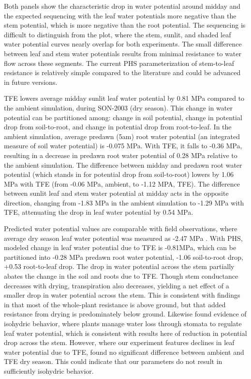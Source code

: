\documentclass[draft,linenumbers]{agujournal}
\begin{document}
    Both panels show the characteristic drop in water potential around midday and the expected sequencing with 
    the leaf water potentials more negative than the stem potential, which is more negative than the root potential.
    The sequencing is difficult to distinguish from the plot, where the stem, sunlit, and shaded leaf water potential curves nearly overlap for both experiments. 
    The small difference between leaf and stem water potentials results from minimal resistance to water flow across these segments. 
    The current PHS parameterization of stem-to-leaf resistance is relatively simple compared to the literature \citep{franks2007} and could be advanced in future versions. 
    
    TFE lowers average midday sunlit leaf water potential by 0.81 MPa compared to the ambient simulation, during SON-2003 (dry season).
    This change in water potential can be partitioned among: change in soil potential, change in potential drop from soil-to-root, and change in potential drop from root-to-leaf. 
    In the ambient simulation, average predawn (5am) root water potential (an integrated measure of soil water potential) is -0.075 MPa. 
    With TFE, it falls to -0.36 MPa, resulting in a decrease in predawn root water potential of 0.28 MPa relative to the ambient simulation. 
    The difference between midday and predawn root water potential (which stands in for potential drop from soil-to-root) 
    lowers by 1.06 MPa with TFE (from -0.06 MPa, ambient, to -1.12 MPA, TFE).
    The difference between sunlit leaf and stem water potential at midday acts in the opposite direction, changing from
    -1.83 MPa in the ambient simulation to -1.29 MPa with TFE, attenuating the drop in leaf water potential by 0.54 MPa.
    
    Predicted water potential values are comparable with field observations, where average dry season leaf water potential was measured as -2.47 MPa \citep{fisher2006}.
    With PHS, modeled change in leaf water potential due to TFE is -0.81MPa, which can be partitioned into -0.28 MPa predawn root water potential, -1.06 soil-to-root drop, +0.53 root-to-leaf drop.
    The drop in water potential across the stem partially abates the change in the soil and roots due to TFE. 
    Though stem conductance decreases with drying, transpiration also decreases, yielding a net effect of a smaller drop in water potential across the stem.
    This is consistent with findings in \cite{fisher2006} that most of the whole-plant resistance is above ground, but that added resistance from drying is predominately below ground.
    Likewise \cite{fisher2006} found evidence of isohydric behavior, where plants manage water loss through stomata to regulate leaf water potential, 
    which is consistent with results here of reduction in potential drop across the stem.
    However, where our experiment features declines in leaf water potential due to TFE, \cite{fisher2006} found no significant difference between ambient and TFE dry season.
    This could indicate that our parameters do not result in sufficiently isohydric behavior.
    
\end{document}
